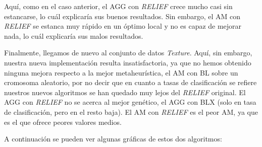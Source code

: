 \documentclass[11pt,a4paper]{article}
\begin{document}
Aquí, como en el caso anterior, el AGG con \textit{RELIEF} crece mucho casi sin estancarse, lo cuál explicaría sus buenos
resultados. Sin embargo, el AM con \textit{RELIEF} se estanca muy rápido en un óptimo local y no es capaz de mejorar nada, lo
cuál explicaría sus malos resultados.

Finalmente, llegamos de nuevo al conjunto de datos \textit{Texture}. Aquí, sin embargo, nuestra nueva implementación resulta
insatisfactoria, ya que no hemos obtenido ninguna mejora respecto a la mejor metaheurística, el AM con BL sobre un cromosoma
aleatorio, por no decir que en cuanto a tasas de clasificación se refiere nuestros nuevos algoritmos se han quedado
muy lejos del \textit{RELIEF} original. El AGG con \textit{RELIEF} no se acerca al mejor genético, el AGG con BLX (solo en tasa
de clasificación, pero en el resto baja). El AM con \textit{RELIEF} es el peor AM, ya que es el que ofrece peores valores medios.

A continuación se pueden ver algunas gráficas de estos dos algoritmos:
\end{document}
